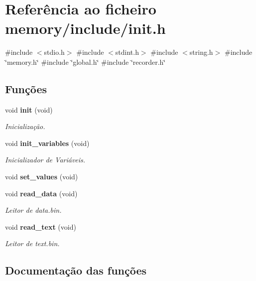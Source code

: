 \section{Referência ao ficheiro memory/include/init.h}
\label{init_8h}
{\ttfamily \#include $<$stdio.\+h$>$}\newline
{\ttfamily \#include $<$stdint.\+h$>$}\newline
{\ttfamily \#include $<$string.\+h$>$}\newline
{\ttfamily \#include \char`\"{}memory.\+h\char`\"{}}\newline
{\ttfamily \#include \char`\"{}global.\+h\char`\"{}}\newline
{\ttfamily \#include \char`\"{}recorder.\+h\char`\"{}}\newline
\subsection*{Funções}
\begin{DoxyCompactItemize}
\item 
void \textbf{ init} (void)
\begin{DoxyCompactList}\small\item\em Inicialização. \end{DoxyCompactList}\item 
void \textbf{ init\+\_\+variables} (void)
\begin{DoxyCompactList}\small\item\em Inicializador de Variáveis. \end{DoxyCompactList}\item 
void \textbf{ set\+\_\+values} (void)
\item 
void \textbf{ read\+\_\+data} (void)
\begin{DoxyCompactList}\small\item\em Leitor de data.\+bin. \end{DoxyCompactList}\item 
void \textbf{ read\+\_\+text} (void)
\begin{DoxyCompactList}\small\item\em Leitor de text.\+bin. \end{DoxyCompactList}\end{DoxyCompactItemize}


\subsection{Documentação das funções}
\mbox{\label{init_8h_a2858154e2009b0e6e616f313177762bc}} 
